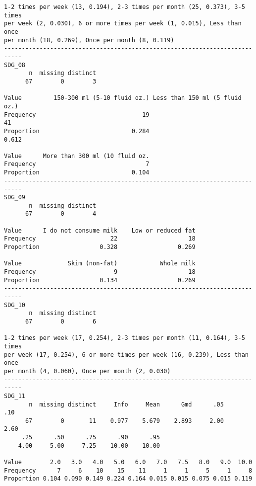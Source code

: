 \documentclass[]{article}
\begin{document}
\begin{verbatim}
1-2 times per week (13, 0.194), 2-3 times per month (25, 0.373), 3-5 times
per week (2, 0.030), 6 or more times per week (1, 0.015), Less than once
per month (18, 0.269), Once per month (8, 0.119)
---------------------------------------------------------------------------
SDG_08 
       n  missing distinct 
      67        0        3 
                                                                        
Value         150-300 ml (5-10 fluid oz.) Less than 150 ml (5 fluid oz.)
Frequency                              19                             41
Proportion                          0.284                          0.612
                                         
Value      More than 300 ml (10 fluid oz.
Frequency                               7
Proportion                          0.104
---------------------------------------------------------------------------
SDG_09 
       n  missing distinct 
      67        0        4 
                                                      
Value      I do not consume milk    Low or reduced fat
Frequency                     22                    18
Proportion                 0.328                 0.269
                                                      
Value             Skim (non-fat)            Whole milk
Frequency                      9                    18
Proportion                 0.134                 0.269
---------------------------------------------------------------------------
SDG_10 
       n  missing distinct 
      67        0        6 

1-2 times per week (17, 0.254), 2-3 times per month (11, 0.164), 3-5 times
per week (17, 0.254), 6 or more times per week (16, 0.239), Less than once
per month (4, 0.060), Once per month (2, 0.030)
---------------------------------------------------------------------------
SDG_11 
       n  missing distinct     Info     Mean      Gmd      .05      .10 
      67        0       11    0.977    5.679    2.893     2.00     2.60 
     .25      .50      .75      .90      .95 
    4.00     5.00     7.25    10.00    10.00 
                                                                      
Value        2.0   3.0   4.0   5.0   6.0   7.0   7.5   8.0   9.0  10.0
Frequency      7     6    10    15    11     1     1     5     1     8
Proportion 0.104 0.090 0.149 0.224 0.164 0.015 0.015 0.075 0.015 0.119
                

\end{verbatim}
\end{document}
